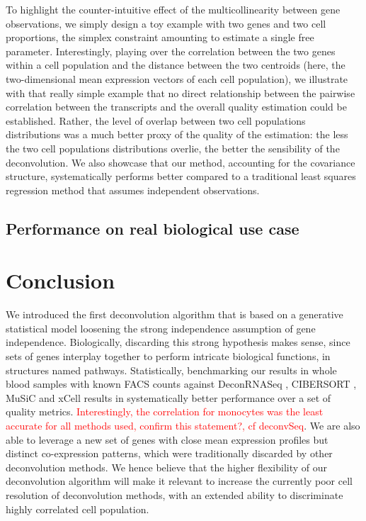 \documentclass[long, final]{jobim}
\begin{document}
To highlight the counter-intuitive effect of the multicollinearity between gene observations, we simply design a toy example with two genes and two cell proportions, the simplex constraint amounting to estimate a single free parameter. Interestingly, playing over the correlation between the two genes within a cell population and the distance between the two centroids (here, the two-dimensional mean expression vectors of each cell population), we illustrate with that really simple example that no direct relationship between the pairwise correlation between the transcripts and the overall quality estimation could be established. Rather, the level of overlap between two cell populations distributions was a much better proxy of the quality of the estimation: the less the two cell populations distributions overlie, the better the sensibility of the deconvolution. We also showcase that our method, accounting for the covariance structure, systematically performs better compared to a traditional least squares regression method that assumes independent observations. 



\subsection{Performance on real biological use case}
\label{subsec:sim-real}



\section{Conclusion}
\label{sec:conclusion}
We introduced the first deconvolution algorithm that is based on a generative statistical model loosening the strong independence assumption of gene independence. Biologically, discarding this strong hypothesis makes sense, since sets of genes interplay together to perform intricate biological functions, in structures named pathways. 
Statistically, benchmarking our results in whole blood samples with known FACS counts against DeconRNASeq \cite{gong_szustakowski13}, CIBERSORT \cite{newman_etal15}, MuSiC \cite{wang_etal19} and xCell \cite{aran_etal17} results in systematically better performance over a set of quality metrics. \textcolor{red}{Interestingly, the correlation for monocytes was the least accurate for all methods used, confirm this statement?, cf deconvSeq}. We are also able to leverage a new set of genes with close mean expression profiles but distinct co-expression patterns, which were traditionally discarded by other deconvolution methods. We hence believe that the higher flexibility of our deconvolution algorithm will make it relevant to increase the currently poor cell resolution of deconvolution methods, with an extended ability to discriminate highly correlated cell population.  
\end{document}
